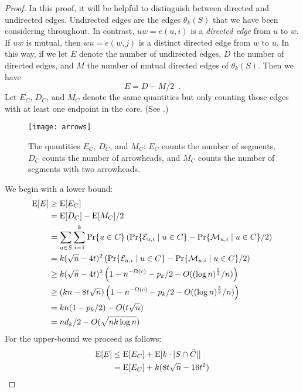 \documentclass{patmorin}
\begin{document}
\begin{proof}
  In this proof, it will be helpful to distinguish between directed
  and undirected edges. Undirected edges are the edges $\theta_k(S)$
  that we have been considering throughout.  In contrast, $uw=e(u,i)$
  is a \emph{directed edge} from $u$ to $w$.  If $uw$ is mutual, then
  $wu=e(w,j)$ is a distinct directed edge from $w$ to $u$.  In this way,
  if we let $E$ denote the number of undirected edges, $D$ the number
  of directed edges, and $M$ the number of mutual directed edges of
  $\theta_k(S)$.   Then we have
  \[  
     E = D - M/2 \enspace . 
  \]
  Let $E_C$, $D_C$, and $M_C$ denote the same quantities but only
  counting those edges with at least one endpoint in the core. (See .)

  \begin{figure}
    \begin{center}
      \texttt{[image: arrows]}
    \end{center}
    \caption{The quantities $E_C$, $D_C$, and $M_C$: $E_C$ counts the
      number of segments,  $D_C$ counts the number of arrowheads, and $M_C$
      counts the number of segments with two arrowheads.}
  \end{figure}
  We begin with a lower bound:
  \begin{align*}
   \mathrm{E}[E] & \ge \mathrm{E}[E_C] \\
         & = \mathrm{E}[D_C] - \mathrm{E}[M_C]/2 \\
         & = \sum_{u\in S}\sum_{i=1}^k\Pr\{u\in C\}
              \left(\Pr\{\mathcal{E}_{u,i}\mid u\in C\}
                - \Pr\{\mathcal{M}_{u,i}\mid u\in C\}/2 \right) \\
        & = k(\sqrt{n}-4t)^2
              \left(\Pr\{\mathcal{E}_{u,i}\mid u\in C\}
                - \Pr\{\mathcal{M}_{u,i}\mid u\in C\}/2 \right) \\
        & \ge k(\sqrt{n}-4t)^2
              \left(1-n^{-\Omega(c)} - p_k/2 - O((\log n)^\frac52/n)\right) \\
        & \ge (kn - 8t\sqrt{n})
              \left(1-n^{-\Omega(c)} - p_k/2 - O((\log n)^\frac52/n)\right) \\
        & = kn(1-p_k/2) - O(t\sqrt{n}) \\
        & = nd_k/2 - O(\sqrt{nk\log n})
  \end{align*} 
  For the upper-bound we proceed as follows:
  \begin{align*}
     \E[E] & \le \E[E_C] + \E[k\cdot|S\cap\bar{C}|] \\
           & = \E[E_C] + k(8t\sqrt{n}-16t^2) \\

\end{align*}
\end{proof}
\end{document}
